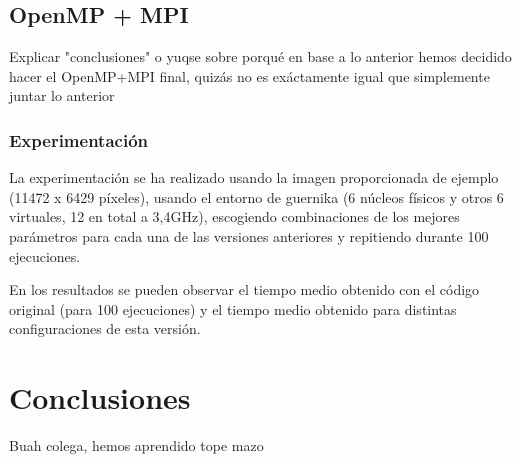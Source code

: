 \documentclass[12pt]{report} %
\begin{document}
\section{OpenMP + MPI}
\label{sec:OpenMP+MPI}
Explicar "conclusiones" o yuqse sobre porqué en base a lo anterior hemos decidido hacer el OpenMP+MPI final, quizás no es exáctamente igual que simplemente juntar lo anterior


\subsection{Experimentación}

La experimentación se ha realizado usando la imagen proporcionada de ejemplo (11472 x 6429 píxeles),
usando el entorno de guernika (6 núcleos físicos y otros 6 virtuales, 12 en total a 3,4GHz), escogiendo
combinaciones de los mejores parámetros para cada una de las versiones anteriores y repitiendo
durante 100 ejecuciones.

En los resultados se pueden observar el tiempo medio obtenido con el código original (para 100 ejecuciones)
y el tiempo medio obtenido para distintas configuraciones de esta versión.

\chapter{Conclusiones}

Buah colega, hemos aprendido tope mazo




\nocite{*} %

\clearpage
{}
\printbibliography
\end{document}
